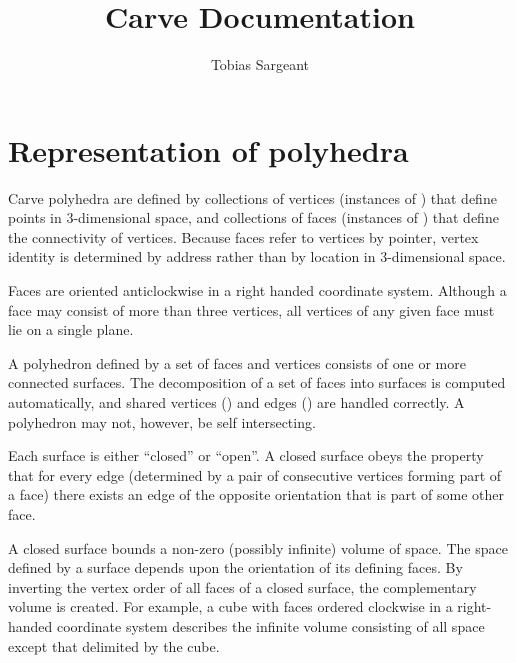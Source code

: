 \documentclass{carve}
\begin{document}
\title{Carve Documentation}
\author{Tobias Sargeant}

\frontmatter

\maketitle

\cleardoublepage\tableofcontents
\cleardoublepage\listoffigures
\cleardoublepage\listoftables
\cleardoublepage\lstlistoflistings

\mainmatter

\chapter{Representation of polyhedra}

Carve polyhedra are defined by collections of vertices (instances of
) that define points in 3-dimensional space,
and collections of faces (instances of ) that
define the connectivity of vertices. Because faces refer to vertices
by pointer, vertex identity is determined by address rather than by
location in 3-dimensional space.

Faces are oriented anticlockwise in a right handed coordinate
system. Although a face may consist of more than three vertices, all
vertices of any given face must lie on a single plane.

A polyhedron defined by a set of faces and vertices consists of one or
more connected surfaces. The decomposition of a set of faces into
surfaces is computed automatically, and shared vertices
() and edges
() are handled correctly. A
polyhedron may not, however, be self intersecting.

Each surface is either ``closed'' or ``open''. A closed surface obeys
the property that for every edge (determined by a pair of consecutive
vertices forming part of a face) there exists an edge of the opposite
orientation that is part of some other face.

A closed surface bounds a non-zero (possibly infinite) volume of
space. The space defined by a surface depends upon the orientation of
its defining faces. By inverting the vertex order of all faces of a
closed surface, the complementary volume is created. For example, a
cube with faces ordered clockwise in a right-handed coordinate system
describes the infinite volume consisting of all space except that
delimited by the cube.
\end{document}
